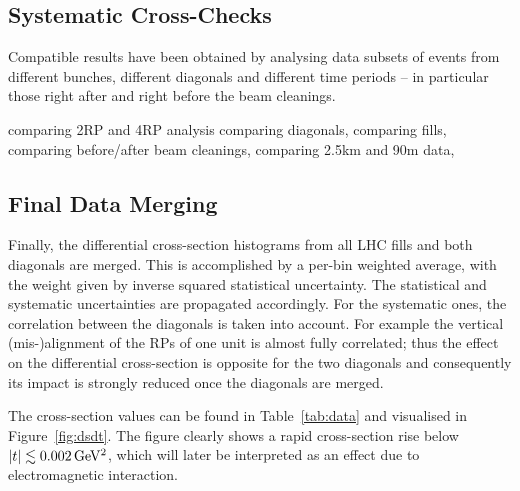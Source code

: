 
\subsection{Systematic Cross-Checks}
\label{sec:cross checks}

Compatible results have been obtained by analysing data subsets of events from different bunches, different diagonals and different time periods -- in particular those right after and right before the beam cleanings.


comparing 2RP and 4RP analysis
comparing diagonals,
comparing fills,
comparing before/after beam cleanings,
comparing 2.5km and 90m data,


\subsection{Final Data Merging}
\label{sec:final data merging}

Finally, the differential cross-section histograms from all LHC fills and both diagonals are merged. This is accomplished by a per-bin weighted average, with the weight given by inverse squared statistical uncertainty. The statistical and systematic uncertainties are propagated accordingly. For the systematic ones, the correlation between the diagonals is taken into account. For example the vertical (mis-)alignment of the RPs of one unit is almost fully correlated; thus the effect on the differential cross-section is opposite for the two diagonals and consequently its impact is strongly reduced once the diagonals are merged.

The cross-section values can be found in Table~\ref{tab:data} and visualised in Figure~\ref{fig:dsdt}. The figure clearly shows a rapid cross-section rise below $|t| \lesssim 0.002\,{\rm GeV^2}$, which will later be interpreted as an effect due to electromagnetic interaction.



